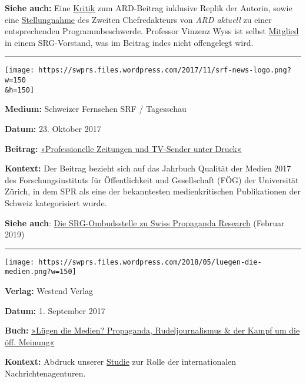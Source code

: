 \textbf{Siehe auch:} Eine
\href{https://paulschreyer.wordpress.com/2017/11/02/jetzt-bewiesen-ard-faktenfinder-sind-vollkommen-unabhaengig/}{Kritik}
zum ARD-Beitrag inklusive Replik der Autorin, sowie eine
\href{https://swprs.files.wordpress.com/2019/04/ard-aktuell-stellungnahme.pdf}{Stellungnahme}
des Zweiten Chefredakteurs von \emph{ARD aktuell} zu einer
entsprechenden Programmbeschwerde. Professor Vinzenz Wyss ist selbst
\href{https://www.srgd.ch/de/regionen/srg-zurich-schaffhausen/ueber-uns/vorstand/}{Mitglied}
in einem SRG-Vorstand, was im Beitrag indes nicht offengelegt wird.

\begin{center}\rule{0.5\linewidth}{\linethickness}\end{center}

\texttt{[image: https://swprs.files.wordpress.com/2017/11/srf-news-logo.png?w=150\\\&h=150]}

\textbf{Medium:} Schweizer Fernsehen SRF / Tagesschau

\textbf{Datum:} 23. Oktober 2017

\textbf{Beitrag:}
\href{https://www.srf.ch/play/tv/tagesschau-am-mittag/video/professionelle-zeitungen-und-tv-sender-unter-druck?id=7a746d1b-bcff-4547-9039-659aa66c4708}{»Professionelle
Zeitungen und TV-Sender unter Druck«}

\textbf{Kontext:} Der Beitrag bezieht sich auf das Jahrbuch Qualität der
Medien 2017 des Forschungs­instituts für Öffentlichkeit und Gesellschaft
(FÖG) der Universität Zürich, in dem SPR als eine der bekanntesten
medienkritischen Publikationen der Schweiz kategorisiert wurde.

\textbf{Siehe auch}:
\href{https://www.srgd.ch/de/aktuelles/news/2019/01/29/die-russlandberichterstattung-von-srfglobal/}{Die
SRG-Ombudsstelle zu Swiss Propaganda Research} (Februar 2019)

\begin{center}\rule{0.5\linewidth}{\linethickness}\end{center}

\texttt{[image: https://swprs.files.wordpress.com/2018/05/luegen-die-medien.png?w=150]}

\textbf{Verlag:} Westend Verlag

\textbf{Datum:} 1. September 2017

\textbf{Buch:}
\href{https://www.westendverlag.de/buch/luegen-die-medien/}{»Lügen die
Medien? Propaganda, Rudeljournalismus \& der Kampf um die öff. Meinung«}

\textbf{Kontext:} Abdruck unserer
\href{https://swprs.org/der-propaganda-multiplikator/}{Studie} zur Rolle
der internationalen Nachrichtenagenturen.

